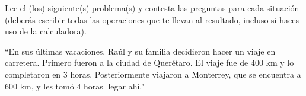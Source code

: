 \question[15] Lee el (los) siguiente(s) problema(s) y contesta las preguntas para cada situaci\'on (deber\'as escribir todas las operaciones que te llevan al resultado, incluso si haces uso de la calculadora).

%         
%     
%     
\begin{center}
    \begin{minipage}[c]{\linewidth}
        ``En sus últimas vacaciones, Raúl y su familia decidieron hacer un viaje en carretera.
        Primero fueron a la ciudad de Quer\'etaro. El viaje fue de 400 km y lo completaron en 3 horas.
        Posteriormente viajaron a Monterrey, que se encuentra a 600 km, y les tomó 4 horas llegar ahí."
    \end{minipage}
\end{center}
\begin{parts}
    { \printanswers
        
    }
    
    
\end{parts}